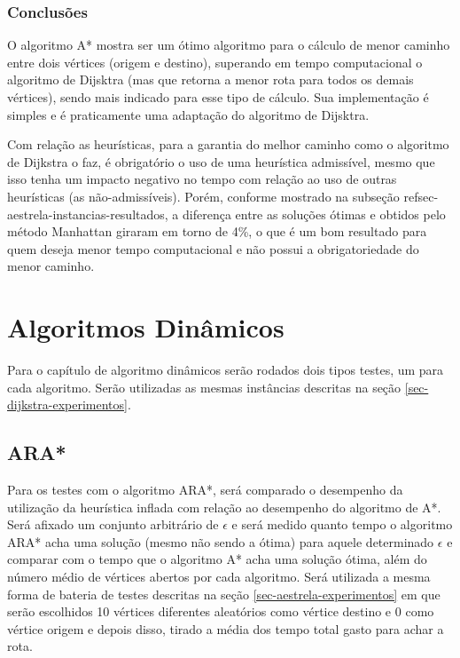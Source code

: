 \subsubsection{Conclusões}
\label{sec-aestrela-conclusao}
O algoritmo A* mostra ser um ótimo algoritmo para o cálculo de menor caminho entre dois vértices (origem e destino), superando em tempo computacional o algoritmo de Dijsktra (mas que retorna a menor rota para todos os demais vértices), sendo mais indicado para esse tipo de cálculo. Sua implementação é simples e é praticamente uma adaptação do algoritmo de Dijsktra.

Com relação as heurísticas, para a garantia do melhor caminho como o algoritmo de Dijkstra o faz, é obrigatório o uso de uma heurística admissível, mesmo que isso tenha um impacto negativo no tempo com relação ao uso de outras heurísticas (as não-admissíveis). Porém, conforme mostrado na subseção ref{sec-aestrela-instancias-resultados}, a diferença entre as soluções ótimas e obtidos pelo método Manhattan giraram em torno de 4\%, o que é um bom resultado para quem deseja menor tempo computacional e não possui a obrigatoriedade do menor caminho.

\section{Algoritmos Dinâmicos}
\label{sec-experimentos-dinamicos}
Para o capítulo de algoritmo dinâmicos serão rodados dois tipos testes, um para cada algoritmo. Serão utilizadas as mesmas instâncias descritas na seção \ref{sec-dijkstra-experimentos}.

\subsection{ARA*}
\label{sec-experimentos-dinamicos-ara}

Para os testes com o algoritmo ARA*, será comparado o desempenho da utilização da heurística inflada com relação ao desempenho do algoritmo de A*. Será afixado um conjunto arbitrário de $\epsilon$ e será medido quanto tempo o algoritmo ARA* acha uma solução (mesmo não sendo a ótima) para aquele determinado $\epsilon$ e comparar com o tempo que o algoritmo A* acha uma solução ótima, além do número médio de vértices abertos por cada algoritmo. Será utilizada a mesma forma de bateria de testes descritas na seção \ref{sec-aestrela-experimentos} em que serão escolhidos 10 vértices diferentes aleatórios como vértice destino e 0 como vértice origem e depois disso, tirado a média dos tempo total gasto para achar a rota.

